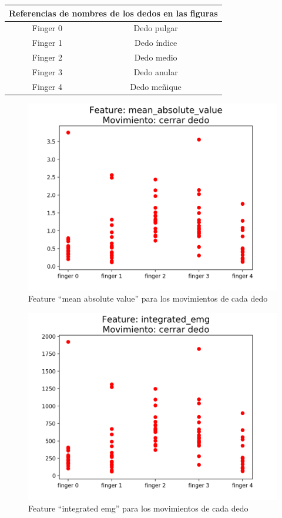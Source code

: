 \documentclass{article}
\begin{document}
\begin{center}
\begin{tabular}{ |c|c| }
\hline
\multicolumn{2}{|c|}{Referencias de nombres de los dedos en las figuras} \\
\hline
 Finger 0 & Dedo pulgar \\
 Finger 1 & Dedo índice \\
 Finger 2 & Dedo medio \\
 Finger 3 & Dedo anular \\
 Finger 4 & Dedo meñique \\
\hline
\end{tabular}
\end{center}

\begin{figure}[ht]
    \centering
    \includegraphics[width=\textwidth]{Figure_1.png}%
    \caption{Feature “mean absolute value” para los movimientos de cada dedo}
    \label{fig:feature1}
\end{figure}

\begin{figure}[ht]
    \centering
    \includegraphics[width=\textwidth]{Figure_2.png}%
    \caption{Feature “integrated emg” para los movimientos de cada dedo}
    \label{fig:feature2}
\end{figure}
\end{document}
